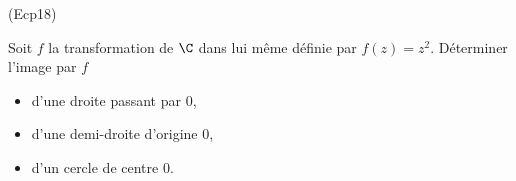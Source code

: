\begin{tiny}(Ecp18)\end{tiny}
Soit $f$ la transformation de $\C$ dans lui m{\^e}me d{\'e}finie par $f(z)=z^{2}$. D{\'e}terminer l'image par $f$

\begin{itemize}
\item  d'une droite passant par $0$,

\item  d'une demi-droite d'origine $0$,

\item  d'un cercle de centre $0$.
\end{itemize}